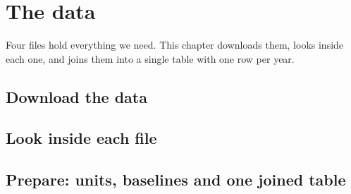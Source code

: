 \chapter{The data}\label{ch:data}
Four files hold everything we need. This chapter downloads them, looks inside each one, and joins them into a single table with one row per year.

\section{Download the data}

\section{Look inside each file}

\section{Prepare: units, baselines and one joined table}

